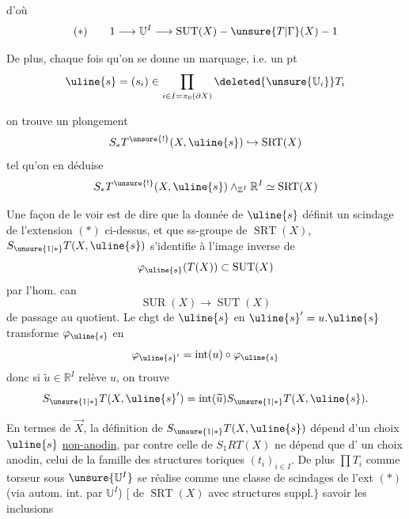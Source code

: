 d'où
\[
(*)\qquad1\longrightarrow\mathbb U^I\longrightarrow
\operatorname{SUT}(X)-\unsure{T|\Gamma}(X)-1
\]

De plus, chaque fois qu'on se donne un
marquage, i.e. un pt 
\[
\uline{s}=(s_i)\in
\prod_{i\in I=\pi_0(\partial X)}
\deleted{\unsure{\mathbb U_i}}T_i
\]

on trouve un plongement
\[
S_*T^{\unsure{!}}(X,\uline{s})\hookrightarrow\operatorname{SRT}(X)
\]
tel qu'on en déduise
\[
S_*T^{\unsure{!}}(X,\uline{s})
\mathbin{\wedge}_{\mathbb Z^I}\mathbb R^I
\simeq\operatorname{SRT}(X)
\]


Une façon de le voir est de dire que
la donnée de $\uline{s}$ définit un scindage
 de
l'extension $(*)$ ci-dessus, et que 
ss-groupe de $\operatorname{SRT}(X)$,
$S_{\unsure{1|*}}T(X,\uline{s})$ s'identifie
à l'image inverse de
\[
\varphi_{\uline{s}}(T(X))\subset\operatorname{SUT}(X)
\]
par l'hom. can
\[
\operatorname{SUR}(X)\longrightarrow\operatorname{SUT}(X)
\]
de passage au quotient. Le chgt de
$\uline{s}$ en $\uline{s}'=u.\uline{s}$
transforme $\varphi_{\uline{s}}$ en
\[
\varphi_{\uline{s}'}=\operatorname{int}(u)\circ\varphi_{\uline{s}}
\]
donc si $\widetilde u\in\mathbb R^I$ relève $u$, on trouve
\[
S_{\unsure{1|*}}T(X,\uline{s}')
=\operatorname{int}(\widetilde u)S_{\unsure{1|*}}T(X,\uline{s}).
\]

En termes de $\vec X$, la définition de
$S_{\unsure{1|*}}T(X,\uline{s})$
dépend d'un choix $\uline{s}$ \uline{non-anodin},
par contre celle de $S_1RT(X)$ ne dépend que d'
un choix anodin, celui de la famille des
structures toriques $(t_i)_{i\in I}$.
De plus $\prod T_i$ comme
torseur sous $\unsure{\mathbb U^I}$ se réalise
comme une classe de scindages de l'ext $(*)$
(via autom. int. par $\mathbb U^I$)
$\bigl[$ de $\operatorname{SRT}(X)$
avec  structures suppl.$\bigr\}$
savoir les inclusions



